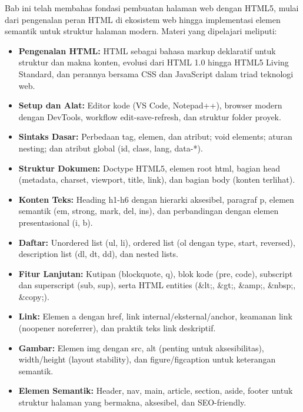 \documentclass[../main.tex]{subfiles}
\begin{document}
\begin{rangkuman}
Bab ini telah membahas fondasi pembuatan halaman web dengan HTML5, mulai dari pengenalan peran HTML di ekosistem web hingga implementasi elemen semantik untuk struktur halaman modern. Materi yang dipelajari meliputi:

\begin{itemize}[leftmargin=*]
  \item \textbf{Pengenalan HTML:} HTML sebagai bahasa markup deklaratif untuk struktur dan makna konten, evolusi dari HTML 1.0 hingga HTML5 Living Standard, dan perannya bersama CSS dan JavaScript dalam triad teknologi web.
  \item \textbf{Setup dan Alat:} Editor kode (VS Code, Notepad++), browser modern dengan DevTools, workflow edit-save-refresh, dan struktur folder proyek.
  \item \textbf{Sintaks Dasar:} Perbedaan tag, elemen, dan atribut; void elements; aturan nesting; dan atribut global (id, class, lang, data-*).
  \item \textbf{Struktur Dokumen:} Doctype HTML5, elemen root html, bagian head (metadata, charset, viewport, title, link), dan bagian body (konten terlihat).
  \item \textbf{Konten Teks:} Heading h1-h6 dengan hierarki aksesibel, paragraf p, elemen semantik (em, strong, mark, del, ins), dan perbandingan dengan elemen presentasional (i, b).
  \item \textbf{Daftar:} Unordered list (ul, li), ordered list (ol dengan type, start, reversed), description list (dl, dt, dd), dan nested lists.
  \item \textbf{Fitur Lanjutan:} Kutipan (blockquote, q), blok kode (pre, code), subscript dan superscript (sub, sup), serta HTML entities (\&lt;, \&gt;, \&amp;, \&nbsp;, \&copy;).
  \item \textbf{Link:} Elemen a dengan href, link internal/eksternal/anchor, keamanan link (noopener noreferrer), dan praktik teks link deskriptif.
  \item \textbf{Gambar:} Elemen img dengan src, alt (penting untuk aksesibilitas), width/height (layout stability), dan figure/figcaption untuk keterangan semantik.
  \item \textbf{Elemen Semantik:} Header, nav, main, article, section, aside, footer untuk struktur halaman yang bermakna, aksesibel, dan SEO-friendly.
\end{itemize}


\end{rangkuman}
\end{document}
